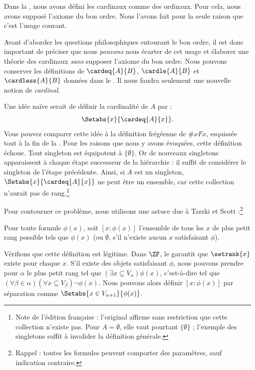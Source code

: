\documentclass[../../../include/open-logic-section]{subfiles}
\begin{document}

Dans la
,
nous avons défini les cardinaux comme des
ordinaux. Pour cela, nous avons supposé
l'axiome du bon ordre. Nous l'avons fait
pour la seule raison que c'est l'usage courant.

Avant d'aborder les questions philosophiques
entourant le bon ordre, il est donc important
de préciser que nous \emph{pouvons} nous écarter
de cet usage et élaborer une théorie des
cardinaux \emph{sans} supposer l'axiome du
bon ordre. Nous pouvons conserver les
définitions de $\cardeq{A}{B}$,
$\cardle{A}{B}$ et $\cardless{A}{B}$
données dans le .
Il nous faudra seulement une nouvelle
notion de \emph{cardinal}.

Une idée naïve serait de définir la cardinalité
de $A$ par :
\[
	\Setabs{x}{\cardeq{A}{x}}.
\]
Vous pouvez comparer cette idée à la définition
frégéenne de $\# x Fx$, esquissée tout à la
fin de la .
Pour les raisons que nous y avons évoquées,
cette définition échoue. Tout singleton est
équipotent à $\{\emptyset\}$. Or de nouveaux
singletons apparaissent à chaque étape
successeur de la hiérarchie : il suffit
de considérer le singleton de l'étape
précédente. Ainsi, si $A$ est un singleton,
$\Setabs{x}{\cardeq{A}{x}}$ ne peut être
un ensemble, car cette collection n'aurait
pas de rang.\footnote{Note de l'édition
française : l'original affirme sans restriction
que cette collection n'existe pas. Pour
$A=\emptyset$, elle vaut pourtant
$\{\emptyset\}$ ; l'exemple des singletons
suffit à invalider la définition générale.}

Pour contourner ce problème, nous utilisons
une astuce due à Tarski et Scott :\footnote{
Rappel : toutes les formules peuvent comporter
des paramètres, sauf indication contraire.}

\begin{defn}
Pour toute formule $\phi(x)$, soit
$[ x : \phi(x)] $ l'ensemble de tous les $x$
de plus petit rang possible tels que $\phi(x)$
(ou $\emptyset$, s'il n'existe aucun $x$
satisfaisant $\phi$).
\end{defn}

Vérifions que cette définition est légitime.
Dans $\ZF$,
le 
garantit que $\setrank{x}$ existe pour
chaque $x$. S'il existe des objets satisfaisant
$\phi$, nous pouvons prendre pour $\alpha$
le plus petit rang tel que
$(\exists x\subseteq V_\alpha)\phi(x)$,
c'est-à-dire tel que
$(\forall \beta \in \alpha)
(\forall x \subseteq V_\beta)\lnot \phi(x)$.
Nous pouvons alors définir
$[x : \phi(x)]$ par séparation comme
$\Setabs{x \in V_{\alpha+1}}{\phi(x)}$.
\end{document}
